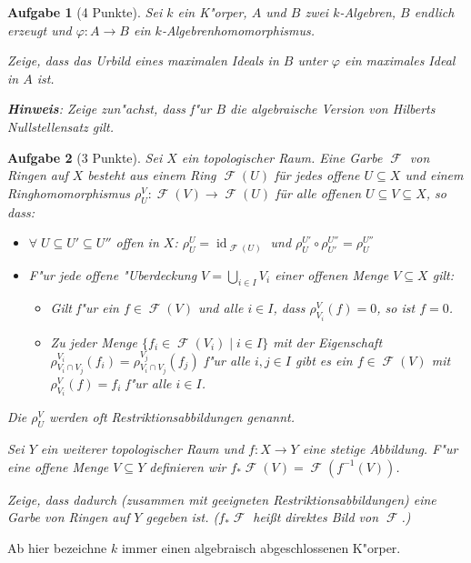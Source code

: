 \documentclass[a4paper, 12pt, numbers=noendperiod, chapterprefix=true]{scrbook}
\theoremstyle{break}
\newtheorem{Aufg}{Aufgabe}
\theoremstyle{nonumberbreak}
\theoremstyle{nonumberplain}
\DeclareMathOperator{\id}{id}
\newcommand{\A}{\mathbb{A}}
\DeclareMathOperator{\Faisceau}{\mathcal{F}} %
\begin{document}
\begin{Aufg}[4 Punkte]
Sei $k$ ein K"orper, $A$ und $B$ zwei $k$-Algebren, $B$ endlich erzeugt und $\varphi \colon A \to B$ ein $k$-Algebrenhomomorphismus. 

Zeige, dass das Urbild eines maximalen Ideals in $B$ unter $\varphi$ ein maximales Ideal in $A$ ist.

\textbf{Hinweis}: Zeige zun"achst, dass f"ur $B$ die algebraische Version von Hilberts Nullstellensatz gilt.
\end{Aufg}

\begin{Aufg}[3 Punkte]
Sei $X$ ein topologischer Raum. Eine Garbe $\Faisceau$ von Ringen auf $X$ besteht aus einem Ring $\Faisceau(U)$ für jedes offene $U \subseteq X$ und einem Ringhomomorphismus $\rho^V_U\colon \Faisceau(V) \to \Faisceau(U)$ für alle offenen $U \subseteq V \subseteq X$, so dass:
\begin{itemize}
	\item $\forall \; U \subseteq U' \subseteq U''$ offen in $X$: $\rho^U_U = \id_{\Faisceau(U)}$ und $\rho^{U'}_U \circ \rho^{U''}_{U'} = \rho^{U''}_{U}$
	\item F"ur jede offene "Uberdeckung $V = \bigcup_{i \in I} V_i$ einer offenen Menge $V \subseteq X$ gilt:
		\begin{itemize}
		\item Gilt f"ur ein $f \in \Faisceau(V)$ und alle $i \in I$, dass $\rho^V_{V_i}(f) = 0$, so ist $f = 0$.
		\item Zu jeder Menge $\{f_i \in \Faisceau(V_i) \mid i \in I\}$ mit der Eigenschaft $\rho^{V_i}_{V_i \cap V_j} (f_i) = \rho^{V_j}_{V_i \cap V_j} (f_j)$ f"ur alle $i, j \in I $ gibt es ein $f \in \Faisceau(V)$ mit $\rho^V_{V_i}(f) = f_i$ f"ur alle $i \in I$.
	\end{itemize}
\end{itemize}
Die $\rho^V_U$ werden oft \textit{Restriktionsabbildungen} genannt.

Sei $Y$ ein weiterer topologischer Raum und $f \colon X \to Y$ eine stetige Abbildung.
F"ur eine offene Menge $V\subseteq Y$ definieren wir $f_*\Faisceau(V) = \Faisceau(f^{-1}(V))$. 

Zeige, dass dadurch (zusammen mit geeigneten Restriktionsabbildungen) eine Garbe von Ringen auf $Y$ gegeben ist. ($f_*\Faisceau$ hei\ss t \textit{direktes Bild} von $\Faisceau$.)
\end{Aufg}

Ab hier bezeichne $k$ immer einen algebraisch abgeschlossenen K"orper.
\end{document}
